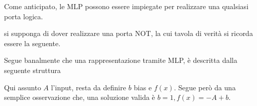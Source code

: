 \documentclass{subfiles}
\begin{document}
Come anticipato, le MLP possono essere impiegate per realizzare una qualsiasi porta logica.
\begin{Example*}
    si supponga di dover realizzare una porta NOT, la cui tavola di verità si ricorda essere la seguente.
    

    Segue banalmente che una rappresentazione tramite MLP, è descritta dalla seguente struttura
    
    Qui assunto \(A\) l'input, resta da definire \(b\) bias e \(f(x)\).
    Segue però da una semplice osservazione che, una soluzione valida è \(b = 1, f(x) = -A + b\).
\end{Example*}
\end{document}
